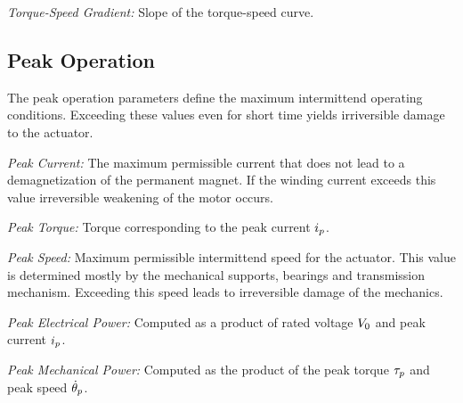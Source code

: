 \documentclass[a4paper,10pt]{cjtdsheet}      %
\begin{document}
\begin{multicols}{2}
\emph{Torque-Speed Gradient:} Slope of the torque-speed curve.

%
%
\subsection*{Peak Operation}
The peak operation parameters define the maximum intermittend operating conditions. Exceeding these values even for short time yields irriversible damage to the actuator.

\emph{Peak Current:} The maximum permissible current that does not lead to a demagnetization of the permanent magnet. If the winding current exceeds this value irreversible weakening of the motor occurs.

\emph{Peak Torque:} Torque corresponding to the peak current $i_p$.

\emph{Peak Speed:} Maximum permissible intermittend speed for the actuator. This value is determined mostly by the mechanical supports, bearings and transmission mechanism. Exceeding this speed leads to irreversible damage of the mechanics.

\emph{Peak Electrical Power:} Computed as a product of rated voltage $V_0$ and peak current $i_p$.

\emph{Peak Mechanical Power:} Computed as the product of the peak torque $\tau_p$ and peak speed $\dot{\theta}_p$.

\end{multicols}
\end{document}
